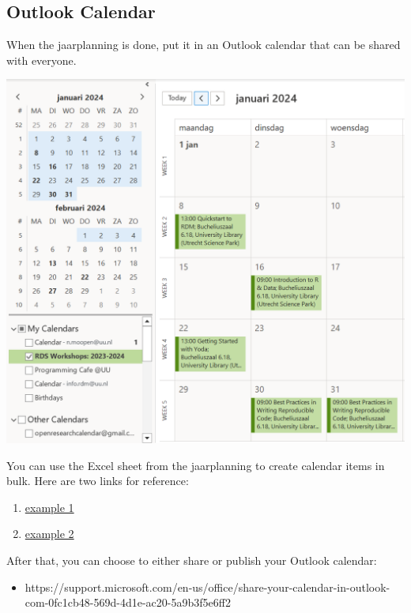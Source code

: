 \documentclass[
  letterpaper,
  DIV=11,
  numbers=noendperiod]{scrreprt}
\providecommand{\tightlist}{%
  \setlength{\itemsep}{0pt}\setlength{\parskip}{0pt}}\usepackage{longtable,booktabs,array}
\begin{document}
\subsection*{Outlook Calendar}\label{outlook-calendar}

When the jaarplanning is done, put it in an Outlook calendar that can be
shared with everyone.

\includegraphics{images/outlook-calendar.PNG}

You can use the Excel sheet from the jaarplanning to create calendar
items in bulk. Here are two links for reference:

\begin{enumerate}
\def\labelenumi{\arabic{enumi}.}
\item
  \href{https://www.techrepublic.com/article/how-to-import-excel-records-into-an-outlook-calendar/}{example
  1}
\item
  \href{https://www.auditexcel.co.za/blog/import-excel-appointments-into-outlook-calendar/}{example
  2}
\end{enumerate}

After that, you can choose to either share or publish your Outlook
calendar:

\begin{itemize}
\tightlist
\item
  https://support.microsoft.com/en-us/office/share-your-calendar-in-outlook-com-0fc1cb48-569d-4d1e-ac20-5a9b3f5e6ff2
\end{itemize}
\end{document}

